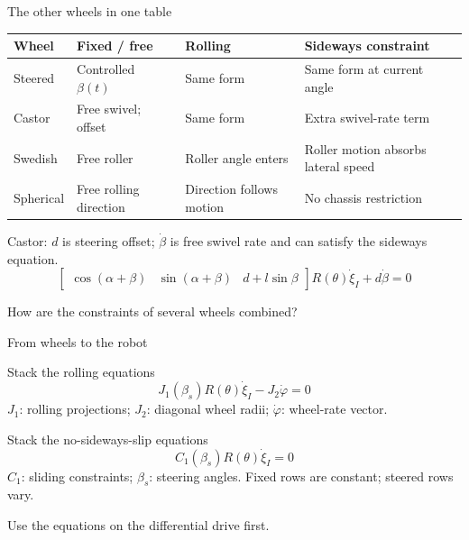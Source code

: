 \documentclass[aspectratio=169]{beamer}
\begin{document}
\begin{frame}[t]{The other wheels in one table}
\small
\vspace{0mm}
\begin{tabularx}{\linewidth}{lXXX}
\toprule Wheel & Fixed / free & Rolling & Sideways constraint\\\midrule
Steered & Controlled $\beta(t)$ & Same form & Same form at current angle\\
Castor & Free swivel; offset & Same form & Extra swivel-rate term\\
Swedish & Free roller & Roller angle enters & Roller motion absorbs lateral speed\\
Spherical & Free rolling direction & Direction follows motion & No chassis restriction\\\bottomrule
\end{tabularx}
\par\vspace{3mm}\small Castor: $d$ is steering offset; $\dot\beta$ is free swivel rate and can satisfy the sideways equation.
\[\begin{bmatrix}\cos(\alpha+\beta)&\sin(\alpha+\beta)&d+l\sin\beta\end{bmatrix}R(\theta)\dot\xi_I+d\dot\beta=0\]


\par\vspace{2mm}\small How are the constraints of several wheels combined?
\end{frame}

\begin{frame}[t]{From wheels to the robot}
\small
\vspace{-2mm}
\begin{block}{Stack the rolling equations}
\[J_1(\beta_s)R(\theta)\dot\xi_I-J_2\dot\varphi=0\]
$J_1$: rolling projections; $J_2$: diagonal wheel radii; $\dot\varphi$: wheel-rate vector.

\end{block}
\vspace{3mm}
\begin{block}{Stack the no-sideways-slip equations}
\[C_1(\beta_s)R(\theta)\dot\xi_I=0\]
$C_1$: sliding constraints; $\beta_s$: steering angles. Fixed rows are constant; steered rows vary.

\end{block}
\par\vspace{2mm}\small Use the equations on the differential drive first.
\end{frame}
\end{document}
